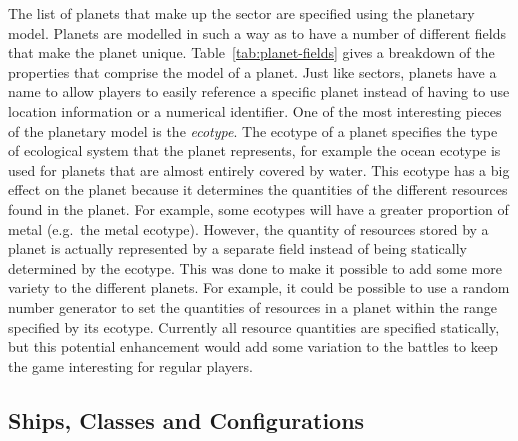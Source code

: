 The list of planets that make up the sector are specified using the planetary model. Planets are modelled in such a way as to have a number of different fields that make the planet unique. Table~\ref{tab:planet-fields} gives a breakdown of the properties that comprise the model of a planet. Just like sectors, planets have a name to allow players to easily reference a specific planet instead of having to use location information or a numerical identifier. One of the most interesting pieces of the planetary model is the \emph{ecotype}. The ecotype of a planet specifies the type of ecological system that the planet represents, for example the ocean ecotype is used for planets that are almost entirely covered by water. This ecotype has a big effect on the planet because it determines the quantities of the different resources found in the planet. For example, some ecotypes will have a greater proportion of metal (e.g.\ the metal ecotype). However, the quantity of resources stored by a planet is actually represented by a separate field instead of being statically determined by the ecotype. This was done to make it possible to add some more variety to the different planets. For example, it could be possible to use a random number generator to set the quantities of resources in a planet within the range specified by its ecotype. Currently all resource quantities are specified statically, but this potential enhancement would add some variation to the battles to keep the game interesting for regular players.

% 
% 

\subsection{Ships, Classes and Configurations}

